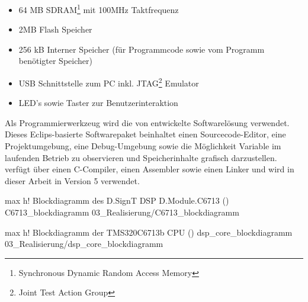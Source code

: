 \begin{itemize}
    \item 64 MB SDRAM\footnote{Synchronous Dynamic Random Access Memory} mit 100MHz Taktfrequenz
    \item 2MB Flash Speicher
    \item 256 kB Interner Speicher (für Programmcode sowie vom Programm benötigter Speicher)
    \item USB Schnittstelle zum PC inkl. JTAG\footnote{Joint Test Action Group} Emulator
    \item LED's sowie Taster zur Benutzerinteraktion
\end{itemize}


Als Programmierwerkzeug wird die von \ti entwickelte Softwarelösung \ccs verwendet.
Dieses Eclips-basierte Softwarepaket beinhaltet einen Sourcecode-Editor, eine Projektumgebung, eine Debug-Umgebung sowie die Möglichkeit Variable im laufenden Betrieb zu observieren und Speicherinhalte grafisch darzustellen. \ccs verfügt über einen C-Compiler, einen Assembler sowie einen Linker und wird in dieser Arbeit in Version 5 verwendet.


         {max}                                                       %
         {h!}                                                  %
         {Blockdiagramm des D.SignT DSP D.Module.C6713 (\vgl \cite[S. 1]{Manual_C6713})}    %
         {C6713_blockdiagramm}                                               %
         {03_Realisierung/C6713_blockdiagramm} 



         {max}                                                       %
         {h!}                                                  %
         {Blockdiagramm der TMS320C6713b CPU (\vgl \cite[S. 13]{Manual_dsp_datasheet})}    %
         {dsp_core_blockdiagramm}                                               %
         {03_Realisierung/dsp_core_blockdiagramm} 





